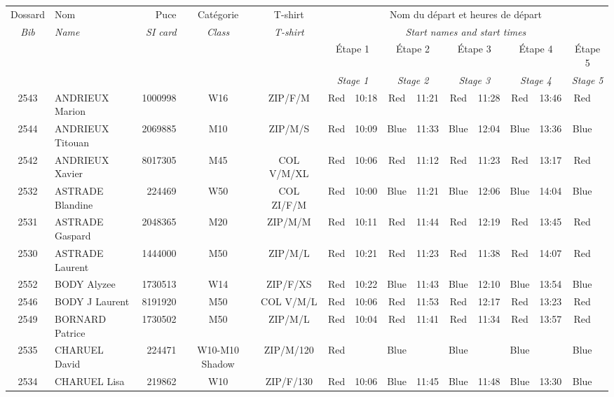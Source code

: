\documentclass{report}
\begin{document}
  \begin{longtable}{|c|l|r|c|c|*{5}{cc|}}
    Dossard & Nom  & Puce    & Catégorie & T-shirt & \multicolumn{10}{c|}{Nom du départ et heures de départ} \\
    \itshape Bib     & \itshape Name & \itshape SI card & \itshape Class  & \itshape  T-shirt  & \multicolumn{10}{c|}{\itshape Start names and start times} \\
    \hline
    & & & & & \multicolumn{2}{c|}{Étape 1} & \multicolumn{2}{c|}{Étape 2} & \multicolumn{2}{c|}{Étape 3} & \multicolumn{2}{c|}{Étape 4} & \multicolumn{2}{c|}{Étape 5} \\
    & & & & & \multicolumn{2}{c|}{\itshape Stage 1} & \multicolumn{2}{c|}{\itshape Stage 2} & \multicolumn{2}{c|}{\itshape Stage 3} & \multicolumn{2}{c|}{\itshape Stage 4} & \multicolumn{2}{c|}{\itshape Stage 5} \\
    \hline
    2543 & ANDRIEUX Marion & 1000998 & W16 & ZIP/F/M & Red & 10:18 & Red & 11:21 & Red & 11:28 & Red & 13:46 & Red &  \\
    2544 & ANDRIEUX Titouan & 2069885 & M10 & ZIP/M/S & Red & 10:09 & Blue & 11:33 & Blue & 12:04 & Blue & 13:36 & Blue &  \\
    2542 & ANDRIEUX Xavier & 8017305 & M45 & COL V/M/XL & Red & 10:06 & Red & 11:12 & Red & 11:23 & Red & 13:17 & Red &  \\
    2532 & ASTRADE Blandine & 224469 & W50 & COL ZI/F/M & Red & 10:00 & Blue & 11:21 & Blue & 12:06 & Blue & 14:04 & Blue &  \\
    2531 & ASTRADE Gaspard & 2048365 & M20 & ZIP/M/M & Red & 10:11 & Red & 11:44 & Red & 12:19 & Red & 13:45 & Red &  \\
    2530 & ASTRADE Laurent & 1444000 & M50 & ZIP/M/L & Red & 10:21 & Red & 11:23 & Red & 11:38 & Red & 14:07 & Red &  \\
    2552 & BODY Alyzee & 1730513 & W14 & ZIP/F/XS & Red & 10:22 & Blue & 11:43 & Blue & 12:10 & Blue & 13:54 & Blue &  \\
    2546 & BODY J Laurent & 8191920 & M50 & COL V/M/L & Red & 10:06 & Red & 11:53 & Red & 12:17 & Red & 13:23 & Red &  \\
    2549 & BORNARD Patrice & 1730502 & M50 & ZIP/M/L & Red & 10:04 & Red & 11:41 & Red & 11:34 & Red & 13:57 & Red &  \\
    2535 & CHARUEL David & 224471 & W10-M10 Shadow & ZIP/M/120 & Red &   & Blue &   & Blue &   & Blue &   & Blue &  \\
    2534 & CHARUEL Lisa & 219862 & W10 & ZIP/F/130 & Red & 10:06 & Blue & 11:45 & Blue & 11:48 & Blue & 13:30 & Blue &  \\

\end{longtable}
\end{document}
